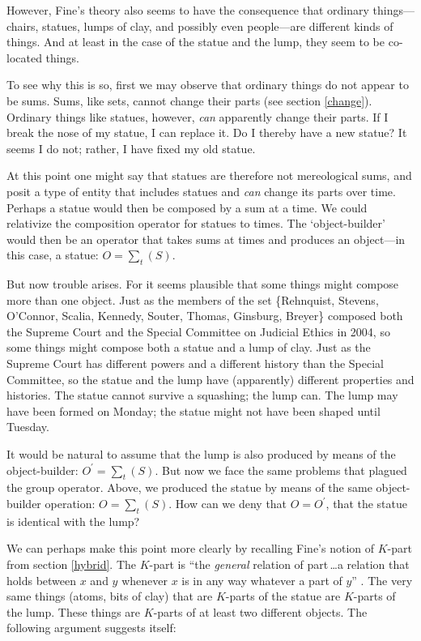 \documentclass[11pt]{article}
\begin{document}
\begin{spacing}{1.5}
However, Fine's theory also seems to have the consequence that
ordinary things---chairs, statues, lumps of clay, and possibly even
people---are different kinds of things.  And at least in the case of
the statue and the lump, they seem to be co-located things.

To see why this is so, first we may observe that ordinary things do
not appear to be sums.  Sums, like sets, cannot change their parts
(see section \ref{change}).  Ordinary things like statues, however,
{\em can} apparently change their parts.  If I break the nose of my
statue, I can replace it.  Do I thereby have a new statue?  It seems I
do not; rather, I have fixed my old statue.

At this point one might say that statues are therefore not
mereological sums, and posit a type of entity that includes statues
and {\em can} change its parts over time.  Perhaps a statue would then
be composed by a sum at a time.  We could relativize the composition
operator for statues to times.  The `object-builder' would then be an
operator that takes sums at times and produces an object---in this
case, a statue: $O = \sum _{t} ( S )$.

But now trouble arises.  For it seems plausible that some things might
compose more than one object.  Just as the members of the set
\{Rehnquist, Stevens, O'Connor, Scalia, Kennedy, Souter, Thomas,
Ginsburg, Breyer\} composed both the Supreme Court and the Special
Committee on Judicial Ethics in 2004, so some things might compose
both a statue and a lump of clay.  Just as the Supreme Court has
different powers and a different history than the Special Committee,
so the statue and the lump have (apparently) different properties and
histories.  The statue cannot survive a squashing; the lump can.  The
lump may have been formed on Monday; the statue might not have been
shaped until Tuesday.

It would be natural to assume that the lump is also produced by means
of the object-builder: $O^{\prime} = \sum _{t} ( S )$.  But now we
face the same problems that plagued the group operator.  Above, we
produced the statue by means of the same object-builder operation: $O
= \sum _{t} ( S )$.  How can we deny that $O = O^{\prime}$, that the
statue is identical with the lump?

We can perhaps make this point more clearly by recalling Fine's notion
of $K$-part from section \ref{hybrid}.  The $K$-part is ``the {\em
  general} relation of part\,\ldots a relation that holds between $x$
and $y$ whenever $x$ is in any way whatever a part of $y$''
\citep[580]{fine2010}.  The very same things (atoms, bits of clay)
that are $K$-parts of the statue are $K$-parts of the lump.  These
things are $K$-parts of at least two different objects.  The following
argument suggests itself:


\end{spacing}
\end{document}
